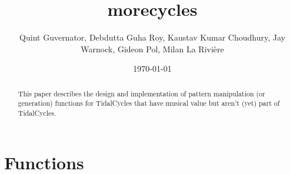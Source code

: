 \documentclass[12pt,a4paper]{article}
\title{morecycles}
\author{Quint Guvernator, Debdutta Guha Roy, Kaustav Kumar Choudhury, Jay Warnock, Gideon Pol, Milan La Rivière}
\date{\today}
\begin{document}
\maketitle

\begin{abstract}
    This paper describes the design and implementation of pattern manipulation (or generation) functions for TidalCycles that have musical value but aren't (yet) part of TidalCycles.
\end{abstract}

\vfill

\tableofcontents

\clearpage





\section{Functions}









\end{document}
